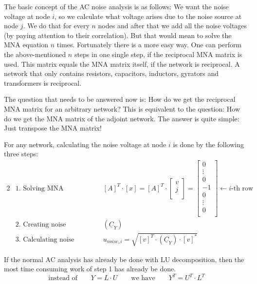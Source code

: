 \addvspace{12pt}

The basic concept of the AC noise analysis is as follows: We want the
noise voltage at node $i$, so we calculate what voltage arises due to
the noise source at node $j$.  We do that for every $n$ nodes and
after that we add all the noise voltages (by paying attention to their
correlation).  But that would mean to solve the MNA equation $n$
times.  Fortunately there is a more easy way.  One can perform the
above-mentioned $n$ steps in one single step, if the reciprocal MNA
matrix is used.  This matrix equals the MNA matrix itself, if the
network is reciprocal.  A network that only contains resistors,
capacitors, inductors, gyrators and transformers is reciprocal.

\addvspace{12pt}

The question that needs to be answered now is: How do we get the
reciprocal MNA matrix for an arbitrary network? This is equivalent to
the question: How do we get the MNA matrix of the adjoint network.
The answer is quite simple: Just transpose the MNA matrix!

\addvspace{12pt}

For any network, calculating the noise voltage at node $i$ is done by
the following three steps:
\begin{alignat}{2}
 & \text{1. Solving MNA equation:} & \qquad & \left[A\right]^T \cdot \left[x\right] =
\left[A\right]^T \cdot
\begin{bmatrix}
v \\
j \\
\end{bmatrix}
=
\begin{bmatrix}
0 \\
\vdots \\
0 \\
-1 \\
0 \\
\vdots \\
0 \\
\end{bmatrix}
\leftarrow i\text{-th row} \\
 & \text{2. Creating noise correlation matrix:} & \qquad
 & \left( \underline{C}_Y \right) \\
 & \text{3. Calculating noise voltage:} & \qquad
 & u_{noise,i} = \sqrt{\left[v\right]^T \cdot \left( \underline{C}_Y \right) \cdot \left[v\right]^*}
\end{alignat}

If the normal AC analysis has already be done with LU decomposition,
then the most time consuming work of step 1 has already be done.
\begin{equation}
\text{instead of} \qquad Y = L\cdot U \qquad \text{we have} \qquad
Y^T = U^T \cdot L^T
\end{equation}

